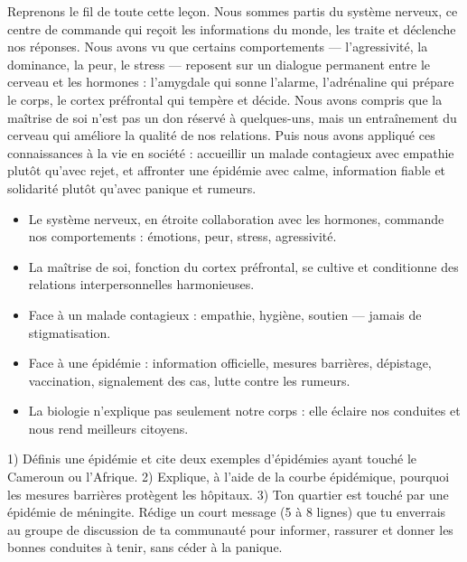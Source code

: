 \documentclass[11pt]{article}
\newcommand{\cle}[1]{{\popxbold\color{popdark}#1}}
\begin{document}
Reprenons le fil de toute cette leçon. Nous sommes partis du \cle{système nerveux}, ce centre de commande qui reçoit les informations du monde, les traite et déclenche nos réponses. Nous avons vu que certains comportements — l'\cle{agressivité}, la \cle{dominance}, la \cle{peur}, le \cle{stress} — reposent sur un dialogue permanent entre le cerveau et les \cle{hormones} : l'amygdale qui sonne l'alarme, l'adrénaline qui prépare le corps, le cortex préfrontal qui tempère et décide. Nous avons compris que la \cle{maîtrise de soi} n'est pas un don réservé à quelques-uns, mais un entraînement du cerveau qui améliore la qualité de nos relations. Puis nous avons appliqué ces connaissances à la vie en société : accueillir un malade contagieux avec empathie plutôt qu'avec rejet, et affronter une épidémie avec calme, information fiable et solidarité plutôt qu'avec panique et rumeurs.

\begin{aretenir}
\begin{itemize}
\item Le système nerveux, en étroite collaboration avec les hormones, commande nos comportements : émotions, peur, stress, agressivité.
\item La maîtrise de soi, fonction du cortex préfrontal, se cultive et conditionne des relations interpersonnelles harmonieuses.
\item Face à un malade contagieux : empathie, hygiène, soutien — jamais de stigmatisation.
\item Face à une épidémie : information officielle, mesures barrières, dépistage, vaccination, signalement des cas, lutte contre les rumeurs.
\item La biologie n'explique pas seulement notre corps : elle éclaire nos conduites et nous rend meilleurs citoyens.
\end{itemize}
\end{aretenir}

\begin{exercice}
1) Définis une épidémie et cite deux exemples d'épidémies ayant touché le Cameroun ou l'Afrique.
2) Explique, à l'aide de la courbe épidémique, pourquoi les mesures barrières protègent les hôpitaux.
3) Ton quartier est touché par une épidémie de méningite. Rédige un court message (5 à 8 lignes) que tu enverrais au groupe de discussion de ta communauté pour informer, rassurer et donner les bonnes conduites à tenir, sans céder à la panique.
\end{exercice}
\end{document}
